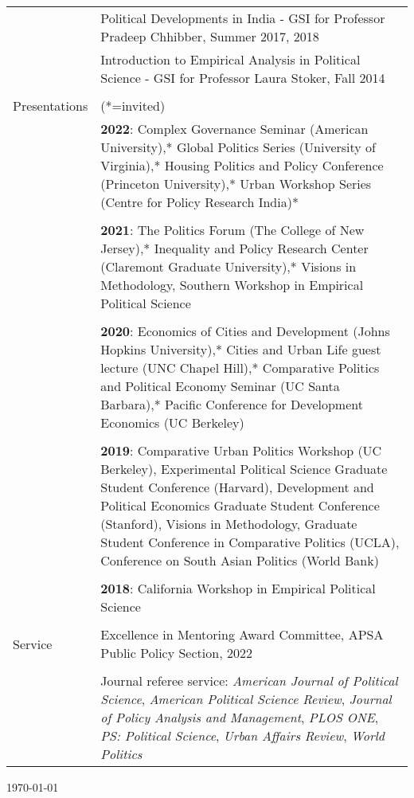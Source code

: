 \documentclass[letterpaper, 10pt]{article}
\begin{document}
\begin{longtable}{p{1in}p{5.5in}}
& Political Developments in India - GSI for Professor Pradeep Chhibber, Summer 2017, 2018\\

& Introduction to Empirical Analysis in Political Science - GSI for Professor Laura Stoker, Fall 2014\\
&\\


{{Presentations}} & (*=invited) \\
& \textbf{2022}: Complex Governance Seminar (American University),* Global Politics Series (University of Virginia),* Housing Politics and Policy Conference (Princeton University),* Urban Workshop Series (Centre for Policy Research India)*\\
&\\

&\textbf{2021}: The Politics Forum (The College of New Jersey),* Inequality and Policy Research Center (Claremont Graduate University),*  Visions in Methodology, Southern Workshop in Empirical Political Science \\
 
 &\\
 &\textbf{2020}: Economics of Cities and Development (Johns Hopkins University),* Cities and Urban Life guest lecture (UNC Chapel Hill),* Comparative Politics and Political Economy Seminar (UC Santa Barbara),* Pacific Conference for Development Economics (UC Berkeley) \\
 &\\


 &\textbf{2019}: Comparative Urban Politics Workshop (UC Berkeley), Experimental Political Science Graduate Student Conference (Harvard), Development and Political Economics Graduate Student Conference (Stanford), Visions in Methodology, Graduate Student Conference in Comparative Politics (UCLA), Conference on South Asian Politics (World Bank)\\
 
 &\\
 &\textbf{2018}: California Workshop in Empirical Political Science
\\
 &\\
 
 

\nohyphens{{Service}}&Excellence in Mentoring Award Committee, APSA Public Policy Section, 2022 \\

&\\

&Journal referee service: \textit{American Journal of Political Science}, \textit{American Political Science Review}, \textit{Journal of Policy Analysis and Management}, \textit{PLOS ONE}, \textit{PS: Political Science}, \textit{Urban Affairs Review}, \textit{World Politics}\\ 

\end{longtable}
\vspace*{\fill}
\flushright \monthyeardate\today 
\end{document}
